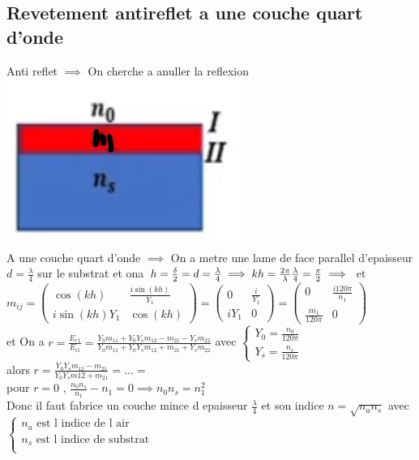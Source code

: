 \documentclass[12pt]{book}
\begin{document}
            \subsection{Revetement antireflet a une couche quart d'onde}
                Anti reflet $\implies$ On cherche a anuller la reflexion  \includegraphics[width=0.3\linewidth]{pic/lametopofshit.png}\\
                A une couche quart d'onde $\implies$ On a metre une lame de face parallel d'epaisseur $d=\frac{\lambda}{4}$ sur le substrat et ona $h=\frac{\delta}{2}=d=\frac{\lambda}{4} \implies kh=\frac{2\pi}{\lambda}\frac{\lambda}{4}=\frac{\pi}{2} \\ \implies$ et   \\
                $m_{ij} =
                \begin{pmatrix}
                    \cos(kh) & \frac{i\sin(kh)}{Y_1} \\
                    i\sin(kh)Y_1 & \cos(kh) 
                \end{pmatrix} =
                \begin{pmatrix}
                    0 & \frac{i}{Y_1} \\
                    iY_1 & 0
                \end{pmatrix} =
                \begin{pmatrix}
                    0 & \frac{i120\pi}{n_1} \\
                    \frac{in_1}{120\pi} & 0
                \end{pmatrix}$ \\
                et On a $r=\frac{E_{r1}}{E_{i1}} = \frac{Y_0m_{11}+Y_0Y_sm_{12}-m_{21}-Y_sm_{22}}{Y_0m_{11}+Y_0Y_sm_{12}+m_{21}+Y_sm_{22}} $ avec $\begin{cases} Y_0 = \frac{n_0}{120\pi} \\ Y_s = \frac{n_s}{120\pi}\end{cases} $ \\ 
                alors  $r = \frac{Y_0Y_sm_{12}-m_{21}}{Y_0Y_sm{12}+m_{21}} =\ldots = $\\
                pour $r = 0 $ , $\frac{n_0n_s}{n_1}-n_1 = 0 \implies n_0n_s=n_1^2$\\
                Donc il faut fabrice un couche mince d epaisseur $\frac{\lambda}{4}$ et son indice $n=\sqrt{n_{a}n_{s}}$ avec $\begin{cases}
                    n_a \text{ est l indice de l air}\\
                    n_s \text{ est l indice de substrat}\\
                \end{cases}$
\end{document}
